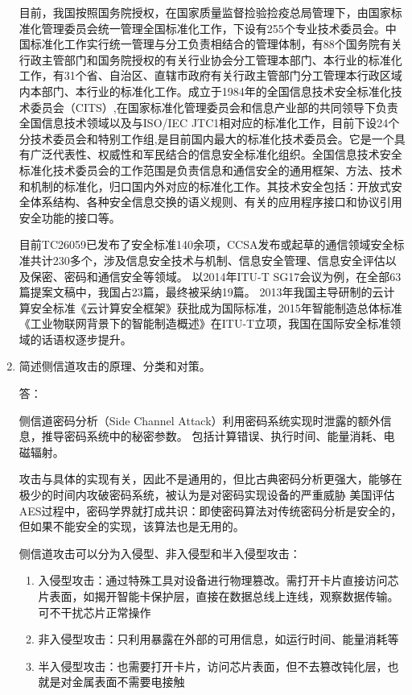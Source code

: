 \documentclass[degree=project,degree-type=project,cjk-font=noto]{thuthesis}
\begin{document}
\begin{enumerate}
目前，我国按照国务院授权，在国家质量监督捡验捡疫总局管理下，由国家标准化管理委员会统一管理全国标准化工作，下设有255个专业技术委员会。中国标准化工作实行统一管理与分工负责相结合的管理体制，有88个国务院有关行政主管部门和国务院授权的有关行业协会分工管理本部门、本行业的标准化工作，有31个省、自治区、直辖市政府有关行政主管部门分工管理本行政区域内本部门、本行业的标准化工作。成立于1984年的全国信息技术安全标准化技术委员会（CITS）,在国家标准化管理委员会和信息产业部的共同领导下负责全国信息技术领域以及与ISO/IEC JTC1相对应的标准化工作，目前下设24个分技术委员会和特别工作组,是目前国内最大的标准化技术委员会。它是一个具有广泛代表性、权威性和军民结合的信息安全标准化组织。全国信息技术安全标准化技术委员会的工作范围是负责信息和通信安全的通用框架、方法、技术和机制的标准化，归口国内外对应的标准化工作。其技术安全包括：开放式安全体系结构、各种安全信息交换的语义规则、有关的应用程序接口和协议引用安全功能的接口等。

目前TC26059已发布了安全标准140余项，CCSA发布或起草的通信领域安全标准共计230多个，涉及信息安全技术与机制、信息安全管理、信息安全评估以及保密、密码和通信安全等领域。
以2014年ITU-T SG17会议为例，在全部63篇提案文稿中，我国占23篇，最终被采纳19篇。
2013年我国主导研制的云计算安全标准《云计算安全框架》获批成为国际标准，2015年智能制造总体标准《工业物联网背景下的智能制造概述》在ITU-T立项，我国在国际安全标准领域的话语权逐步提升。

\item 简述侧信道攻击的原理、分类和对策。

{\heiti 答：}
\newline

侧信道密码分析（Side Channel Attack）利用密码系统实现时泄露的额外信息，推导密码系统中的秘密参数。
包括计算错误、执行时间、能量消耗、电磁辐射。

攻击与具体的实现有关，因此不是通用的，但比古典密码分析更强大，能够在极少的时间内攻破密码系统，被认为是对密码实现设备的严重威胁
美国评估AES过程中，密码学界就打成共识：即使密码算法对传统密码分析是安全的，但如果不能安全的实现，该算法也是无用的。

侧信道攻击可以分为入侵型、非入侵型和半入侵型攻击：

\begin{enumerate}
	\item 入侵型攻击：通过特殊工具对设备进行物理篡改。需打开卡片直接访问芯片表面，如揭开智能卡保护层，直接在数据总线上连线，观察数据传输。可不干扰芯片正常操作
	\item 非入侵型攻击：只利用暴露在外部的可用信息，如运行时间、能量消耗等
	\item 半入侵型攻击：也需要打开卡片，访问芯片表面，但不去篡改钝化层，也就是对金属表面不需要电接触
\end{enumerate}


\end{enumerate}
\end{document}
